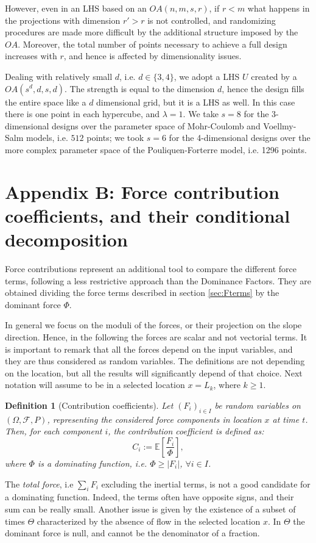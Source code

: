 \documentclass{article}
\newtheorem{definition}[theorem]{Definition}
\begin{document}
However, even in an LHS based on an $OA(n,m,s,r)$, if $r<m$ what happens in the projections with dimension $r'>r$ is not controlled, and randomizing procedures are made more difficult by the additional structure imposed by the $OA$. Moreover, the total number of points necessary to achieve a full design increases with $r$, and hence is affected by dimensionality issues.

Dealing with relatively small $d$, i.e. $d\in\{3,4\}$, we adopt a LHS $U$ created by a $OA(s^d,d,s,d)$. The strength is equal to the dimension $d$, hence the design fills the entire space like a $d$ dimensional grid, but it is a LHS as well. In this case there is one point in each hypercube, and $\lambda=1$. We take $s=8$ for the 3-dimensional designs over the parameter space of Mohr-Coulomb and Voellmy-Salm models, i.e. $512$ points; we took $s=6$ for the 4-dimensional designs over the more complex parameter space of the Pouliquen-Forterre model, i.e. 1296 points.

\section{Appendix B: Force contribution coefficients, and their conditional decomposition}
Force contributions represent an additional tool to compare the different force terms, following a less restrictive approach than the Dominance Factors. They are obtained dividing the force terms described in section \ref{sec:Fterms} by the dominant force $\Phi$.

In general we focus on the moduli of the forces, or their projection on the slope direction. Hence, in the following the forces are scalar and not vectorial terms. It is important to remark that all the forces depend on the input variables, and they are thus considered as random variables. The definitions are not depending on the location, but all the results will significantly depend of that choice. Next notation will assume to be in a selected location $x=L_k$, where $k\ge 1$.

\begin{definition}[Contribution coefficients]
Let $(F_i)_{i\in I}$ be random variables on $(\Omega, \mathcal F, P)$, representing the considered force components in location $x$ at time $t$. Then, for each component $i$, the contribution coefficient is defined as:
$$C_i:=\mathbb E\left[\frac{F_i}{\Phi}\right],$$
where $\Phi$ is a dominating function, i.e. $\Phi\ge |F_i|$, $\forall i\in I$.
\end{definition}
The \emph{total force}, i.e $\sum_i F_i$ excluding the inertial terms, is not a good candidate for a dominating function. Indeed, the terms often have opposite signs, and their sum can be really small. Another issue is given by the existence of a subset of times $\Theta$ characterized by the absence of flow in the selected location $x$. In $\Theta$ the dominant force is null, and cannot be the denominator of a fraction.
\end{document}
